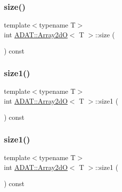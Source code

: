 \mbox{\label{classADAT_1_1Array2dO_a2f8311cdee5283e57e5d13887a463123}} 
\subsubsection{\texorpdfstring{size()}{size()}\hspace{0.1cm}{\footnotesize\ttfamily [2/2]}}
{\footnotesize\ttfamily template$<$typename T$>$ \\
int \mbox{\hyperlink{classADAT_1_1Array2dO}{A\+D\+A\+T\+::\+Array2dO}}$<$ T $>$\+::size (\begin{DoxyParamCaption}{ }\end{DoxyParamCaption}) const\hspace{0.3cm}{\ttfamily [inline]}}

\mbox{\label{classADAT_1_1Array2dO_a8713bf273adbc5e2313e1afd8f88fe7c}} 
\subsubsection{\texorpdfstring{size1()}{size1()}\hspace{0.1cm}{\footnotesize\ttfamily [1/2]}}
{\footnotesize\ttfamily template$<$typename T$>$ \\
int \mbox{\hyperlink{classADAT_1_1Array2dO}{A\+D\+A\+T\+::\+Array2dO}}$<$ T $>$\+::size1 (\begin{DoxyParamCaption}{ }\end{DoxyParamCaption}) const\hspace{0.3cm}{\ttfamily [inline]}}

\mbox{\label{classADAT_1_1Array2dO_a8713bf273adbc5e2313e1afd8f88fe7c}} 
\subsubsection{\texorpdfstring{size1()}{size1()}\hspace{0.1cm}{\footnotesize\ttfamily [2/2]}}
{\footnotesize\ttfamily template$<$typename T$>$ \\
int \mbox{\hyperlink{classADAT_1_1Array2dO}{A\+D\+A\+T\+::\+Array2dO}}$<$ T $>$\+::size1 (\begin{DoxyParamCaption}{ }\end{DoxyParamCaption}) const\hspace{0.3cm}{\ttfamily [inline]}}

